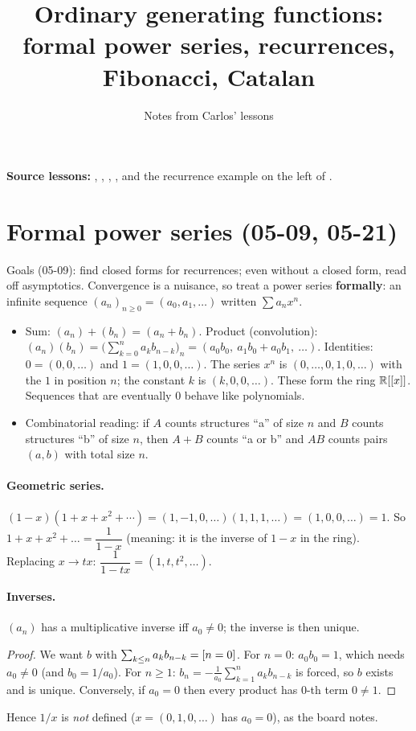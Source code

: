 \documentclass[11pt]{article}
\title{Ordinary generating functions:\\ formal power series, recurrences, Fibonacci, Catalan}
\author{Notes from Carlos' lessons}
\date{}
\begin{document}
\maketitle

\textbf{Source lessons:}
,
,
,
,
and the recurrence example on the left of .

\section{Formal power series (05-09, 05-21)}

Goals (05-09): find closed forms for recurrences; even without a closed form, read off asymptotics. Convergence is a nuisance, so treat a power series \textbf{formally}: an infinite sequence $(a_n)_{n\ge0}=(a_0,a_1,\dots)$ written $\sum a_nx^n$.

\begin{itemize}[nosep]
  \item Sum: $(a_n)+(b_n)=(a_n+b_n)$. Product (convolution): $(a_n)(b_n)=\bigl(\sum_{k=0}^na_kb_{n-k}\bigr)_n=(a_0b_0,\ a_1b_0+a_0b_1,\ \dots)$. Identities: $0=(0,0,\dots)$ and $1=(1,0,0,\dots)$. The series $x^n$ is $(0,\dots,0,1,0,\dots)$ with the $1$ in position $n$; the constant $k$ is $(k,0,0,\dots)$. These form the ring $\mathbb{R}[[x]]$. Sequences that are eventually $0$ behave like polynomials.
  \item Combinatorial reading: if $A$ counts structures ``a'' of size $n$ and $B$ counts structures ``b'' of size $n$, then $A+B$ counts ``a or b'' and $AB$ counts pairs $(a,b)$ with total size $n$.
\end{itemize}

\paragraph{Geometric series.} $(1-x)(1+x+x^2+\cdots)=(1,-1,0,\dots)(1,1,1,\dots)=(1,0,0,\dots)=1$. So $1+x+x^2+\dots=\dfrac1{1-x}$ (meaning: it is the inverse of $1-x$ in the ring). Replacing $x\to tx$: $\dfrac1{1-tx}=(1,t,t^2,\dots)$.

\paragraph{Inverses.}
\begin{claim}
$(a_n)$ has a multiplicative inverse iff $a_0\ne0$; the inverse is then unique.
\end{claim}
\begin{proof}
We want $b$ with $\sum_{k\le n}a_kb_{n-k}=[n=0]$. For $n=0$: $a_0b_0=1$, which needs $a_0\ne0$ (and $b_0=1/a_0$). For $n\ge1$: $b_n=-\frac1{a_0}\sum_{k=1}^na_kb_{n-k}$ is forced, so $b$ exists and is unique. Conversely, if $a_0=0$ then every product has $0$-th term $0\ne1$.
\end{proof}
Hence $1/x$ is \emph{not} defined ($x=(0,1,0,\dots)$ has $a_0=0$), as the board notes.
\end{document}
